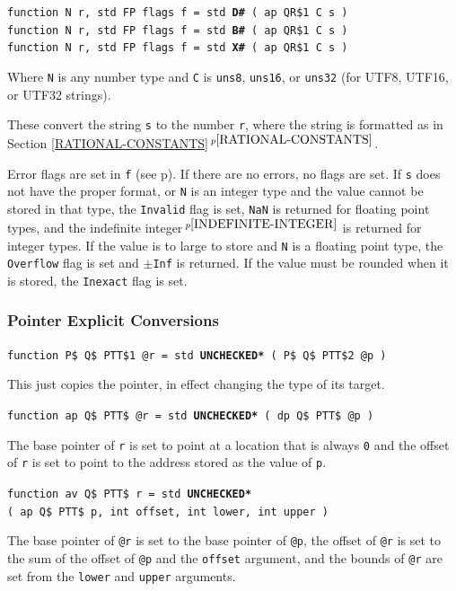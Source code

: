 \documentclass[12pt]{article}
\newcommand{\ttkey}[1]{{\tt \bfseries #1}}
\newcommand{\itemref}[1]{\ref{#1}$\,^{p\pageref{#1}}$}
\newcommand{\pagref}[1]{p\pageref{#1}}
\newcommand{\pagnote}[1]{$\,^{p\pageref{#1}}$}
\newenvironment{indpar}[1][0.3in]%
	{\begin{list}{}%
		     {\setlength{\itemsep}{0in}%
		      \setlength{\topsep}{0in}%
		      \setlength{\parsep}{1ex}%
		      \setlength{\labelwidth}{#1}%
		      \setlength{\leftmargin}{#1}%
		      \addtolength{\leftmargin}{\labelsep}}%
	 \item}%
	{\end{list}}
\begin{document}
{\tt function N r, std FP flags f = std \ttkey{D\#} ( ap QR\$1 C s )} \\
{\tt function N r, std FP flags f = std \ttkey{B\#} ( ap QR\$1 C s )} \\
{\tt function N r, std FP flags f = std \ttkey{X\#} ( ap QR\$1 C s )}
\label{RUN-TIME-STRING-TO-NUMBER-CONVERSIONS}
\begin{indpar}
Where {\tt N} is any number type
and {\tt C} is {\tt uns8}, {\tt uns16}, or {\tt uns32} (for UTF8, UTF16,
or UTF32 strings).

These convert the string {\tt s} to the number {\tt r}, where the
string is formatted as in Section \itemref{RATIONAL-CONSTANTS}.

Error flags are set in {\tt f} (see \pagref{FP-FLAGS-DATA}).
If there are no errors, no flags are set.
If {\tt s} does not have the proper format, or {\tt N} is an integer type
and the value cannot be stored in that type,
the {\tt Invalid} flag is set, {\tt NaN} is returned for floating point types,
and the indefinite integer\pagnote{INDEFINITE-INTEGER}
is returned for integer types.
If the value is to large to store and {\tt N} is a floating point type, the
{\tt Overflow} flag is set and {\tt $\pm$Inf} is returned.
If the value must be rounded when it is stored,
the {\tt Inexact} flag is set.
\end{indpar}

\subsubsection{Pointer Explicit Conversions}

{\tt function P\$ Q\$ PTT\$1 @r = std \ttkey{*UNCHECKED*} ( P\$ Q\$ PTT\$2 @p )}
\begin{indpar}
This just copies the pointer, in effect changing the type of its
target.
\end{indpar}

{\tt function ap Q\$ PTT\$ @r = std \ttkey{*UNCHECKED*} ( dp Q\$ PTT\$ @p )}
\begin{indpar}
The base pointer of {\tt r} is set to point at a location that is
always {\tt 0} and the offset of {\tt r} is set to point to the
address stored as the value of {\tt p}.
\end{indpar}

{\tt function av Q\$ PTT\$ r = std \ttkey{*UNCHECKED*} \\
\hspace*{0.2in}( ap Q\$ PTT\$ p, int offset, int lower, int upper )}
\begin{indpar}
The base pointer of {\tt @r} is set to the base pointer of {\tt @p},
the offset of {\tt @r} is set to the sum of the offset of {\tt @p}
and the {\tt offset} argument, and the bounds of {\tt @r} are set from
the {\tt lower} and {\tt upper} arguments.
\end{indpar}
\end{document}
